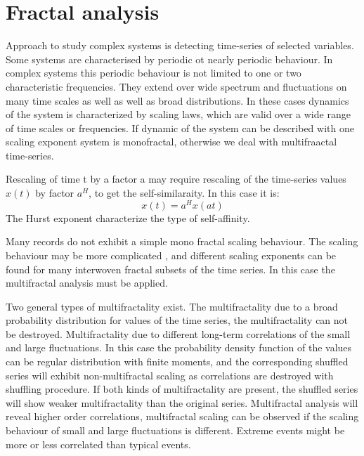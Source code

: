 
\section{Fractal analysis}

Approach to study complex systems is detecting time-series of selected variables. Some systems are characterised by periodic ot nearly periodic behaviour. In complex systems this periodic behaviour is not limited to one or two characteristic frequencies. They extend over wide spectrum and fluctuations on many time scales as well as well as broad distributions. In these cases dynamics of the system is characterized by scaling laws, which are valid over a wide range of time scales or frequencies. If dynamic of the system can be described with one scaling exponent system is monofractal, otherwise we deal with multifraactal time-series.

Rescaling of time t by a factor a may require rescaling of the time-series values $x(t)$ by factor $a^H$, to get the self-similaraity. In this case it is:
$$x(t) = a^Hx(at)$$
The Hurst exponent characterize the type of self-affinity. 

Many records do not exhibit a simple mono fractal scaling behaviour. The scaling behaviour may be more complicated , and different scaling exponents can be found for many interwoven fractal subsets of the time series. In this case the multifractal analysis must be applied. 

Two general types of multifractality exist. The multifractality due to a broad probability distribution for values of the time series, the multifractality can not be destroyed. Multifractality due to different long-term correlations of the small and large fluctuations. In this case the probability density function of the values can be regular distribution with finite moments, and the corresponding shuffled series will exhibit non-multifractal scaling as correlations are destroyed with shuffling procedure. If both kinds of multifractality are present, the shuffled series will show weaker multifractality than the original series. Multifractal analysis will reveal higher order correlations, multifractal scaling can be observed if the scaling behaviour of small and large fluctuations is different. Extreme events might be more or less correlated than typical events.  


